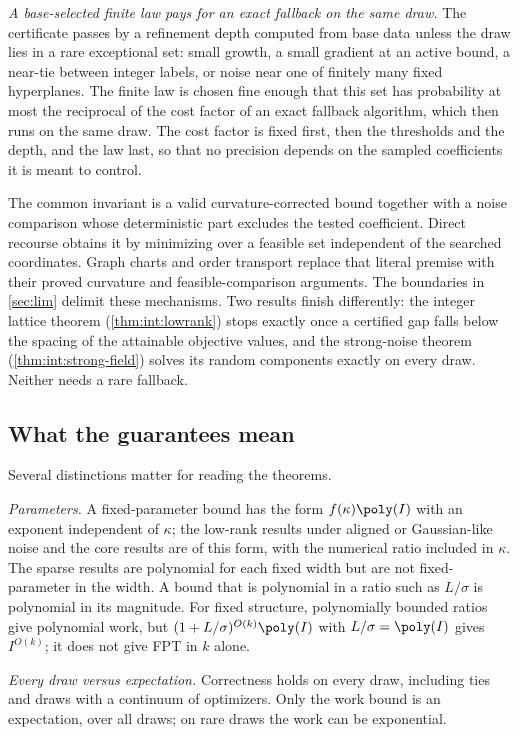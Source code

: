 \emph{A base-selected finite law pays for an exact fallback on the same
draw.} The certificate passes by a refinement depth computed from base data
unless the draw lies in a rare exceptional set: small growth, a small
gradient at an active bound, a near-tie between integer labels, or noise
near one of finitely many fixed hyperplanes. The finite law is chosen fine
enough that this set has probability at most the reciprocal of the cost
factor of an exact fallback algorithm, which then runs on the same draw. The
cost factor is fixed first, then the thresholds and the depth, and the law
last, so that no precision depends on the sampled coefficients it is meant
to control.

The common invariant is a valid curvature-corrected bound together with a
noise comparison whose deterministic part excludes the tested coefficient.
Direct recourse obtains it by minimizing over a feasible set independent of
the searched coordinates. Graph charts and order transport replace that
literal premise with their proved curvature and feasible-comparison
arguments. The boundaries in \cref{sec:lim} delimit these mechanisms. Two
results finish differently: the integer lattice theorem
(\cref{thm:int:lowrank}) stops exactly once a certified gap falls below the
spacing of the attainable objective values, and the strong-noise theorem
(\cref{thm:int:strong-field}) solves its random components exactly on every
draw. Neither needs a rare fallback.

\subsection{What the guarantees mean}\label{sec:intro:meaning}

Several distinctions matter for reading the theorems.

\emph{Parameters.} A fixed-parameter bound has the form $f(\kappa)\poly(I)$
with an exponent independent of $\kappa$; the low-rank results under aligned
or Gaussian-like noise and the core results are of this form, with the
numerical ratio included in $\kappa$. The sparse results are polynomial for
each fixed width but are not fixed-parameter in the width. A bound that is
polynomial in a ratio such as $L/\sigma$ is polynomial in its magnitude.
For fixed structure, polynomially bounded ratios give polynomial work, but
$(1+L/\sigma)^{O(k)}\poly(I)$ with $L/\sigma=\poly(I)$ gives $I^{O(k)}$;
it does not give FPT in $k$ alone.

\emph{Every draw versus expectation.} Correctness holds on every draw,
including ties and draws with a continuum of optimizers. Only the work bound
is an expectation, over all draws; on rare draws the work can be exponential.

